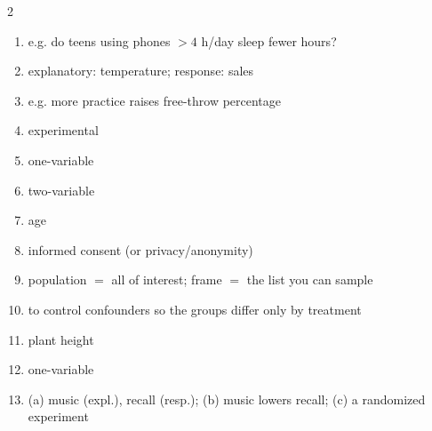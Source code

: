 \documentclass[11pt]{article}
\begin{document}
\begin{keybox}
\begin{multicols}{2}
\small
\begin{enumerate}[leftmargin=*,itemsep=3pt]
  \item e.g. do teens using phones $>4$ h/day sleep fewer hours?
  \item explanatory: temperature; response: sales
  \item e.g. more practice raises free-throw percentage
  \item experimental
  \item one-variable
  \item two-variable
  \item age
  \item informed consent (or privacy/anonymity)
  \item population $=$ all of interest; frame $=$ the list you can sample
  \item to control confounders so the groups differ only by treatment
  \item plant height
  \item one-variable
  \item (a) music (expl.), recall (resp.); (b) music lowers recall; (c) a randomized experiment
\end{enumerate}
\end{multicols}
\end{keybox}
\end{document}
